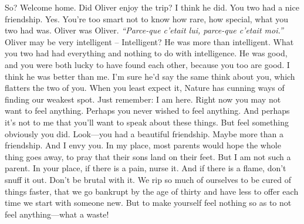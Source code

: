\documentclass[../butidigress.tex]{subfiles}
\begin{document}
\begin{drama}
\perlmanspeaks So? Welcome home. Did Oliver enjoy the trip?
\eliospeaks I think he did.
\perlmanspeaks You two had a nice friendship.
\eliospeaks{} Yes.
\perlmanspeaks You're too smart not to know how rare, how special, what you two had was.
\eliospeaks Oliver was Oliver.
\perlmanspeaks \emph{``Parce-que c'etait lui, parce-que c'etait moi.''} 
\eliospeaks{} Oliver may be very intelligent --
\perlmanspeaks{} Intelligent? He was more than intelligent. What you two had had everything and nothing to do with intelligence. He was good, and you were both lucky to have found each other, because you too are good.
\eliospeaks I think he was better than me.
\perlmanspeaks I'm sure he'd say the same think about you, which flatters the two of you.
\perlmanspeaks{} When you least expect it, Nature has cunning ways of finding our weakest spot. Just remember: I am here. Right now you may not want to feel anything. Perhaps you never wished to feel anything. And perhaps it's not to me that you'll want to speak about these things. But feel something obviously you did.
\perlmanspeaks{} Look---you had a beautiful friendship. Maybe more than a friendship. And I envy you. In my place, most parents would hope the whole thing goes away, to pray that their sons land on their feet. But I am not such a parent. In your place, if there is a pain, nurse it. And if there is a flame, don't snuff it out. Don't be brutal with it. We rip so much of ourselves to be cured of things faster, that we go bankrupt by the age of thirty and have less to offer each time we start with someone new. But to make yourself feel nothing so as to not feel anything---what a waste!

\end{drama}
\end{document}
